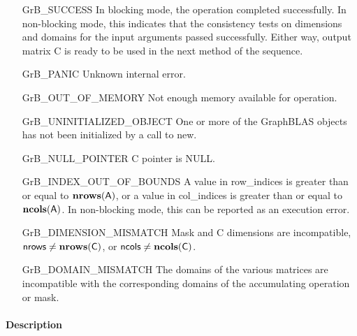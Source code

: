 \begin{itemize}[leftmargin=2.1in]
    \item[{\sf GrB\_SUCCESS}]         In blocking mode, the operation completed
    successfully. In non-blocking mode, this indicates that the consistency 
    tests on dimensions and domains for the input arguments passed successfully. 
    Either way, output matrix {\sf C} is ready to be used in the next method of 
    the sequence.

    \item[{\sf GrB\_PANIC}]            Unknown internal error.
    
    \item[{\sf GrB\_OUT\_OF\_MEMORY}]  Not enough memory available for operation.
    
    \item[{\sf GrB\_UNINITIALIZED\_OBJECT}]  One or more of the GraphBLAS 
    objects has not been initialized by a call to {\sf new}.

    \item[{\sf GrB\_NULL\_POINTER}]  {\sf C} pointer is {\sf NULL}. 

    \item[{\sf GrB\_INDEX\_OUT\_OF\_BOUNDS}]  A value in {\sf row\_indices} 
    is greater than or equal to $\bold{nrows}({\sf A})$, or a value in 
    {\sf col\_indices} is greater than or equal to $\bold{ncols}({\sf A})$.  In 
    non-blocking mode, this can be reported as an execution error.
    
    \item[{\sf GrB\_DIMENSION\_MISMATCH}] {\sf Mask} and {\sf C} dimensions are
    incompatible, ${\sf nrows} \neq \bold{nrows}({\sf C})$, or 
    ${\sf ncols} \neq \bold{ncols}({\sf C})$.

    \item[{\sf GrB\_DOMAIN\_MISMATCH}]     The domains of the various matrices
    are incompatible with the corresponding domains of the accumulating 
    operation or mask.
\end{itemize}

\paragraph{Description}

